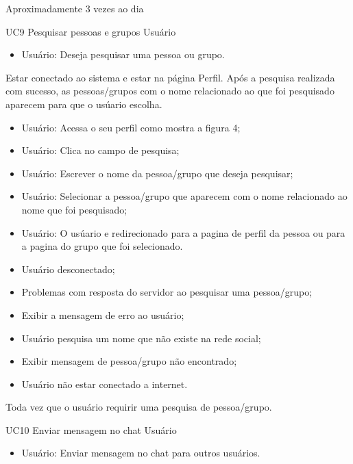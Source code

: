 {Aproximadamente 3 vezes ao dia}
{

}
\casoDeUso
{UC9}
{Pesquisar pessoas e grupos}
{Usuário}
{
\begin{itemize}
	\item Usuário: Deseja pesquisar uma pessoa ou grupo.	
\end{itemize}
}
{Estar conectado ao sistema e estar na página Perfil.}
{Após a pesquisa realizada com sucesso, as pessoas/grupos com o nome relacionado ao que foi pesquisado aparecem para que o usúario escolha.}
{
\begin{itemize}
	\item Usuário: Acessa o seu perfil como mostra a figura 4;
	\item Usuário: Clica no campo de pesquisa;
	\item Usuário: Escrever o nome da pessoa/grupo que deseja pesquisar;
	\item Usuário: Selecionar a pessoa/grupo que aparecem com o nome relacionado ao nome que foi pesquisado;
	\item Usuário: O usúario e redirecionado para a pagina de perfil da pessoa ou para a pagina do grupo que foi selecionado.
\end{itemize}
}
{
\begin{itemize}
	\item Usuário desconectado;
	\item Problemas com resposta do servidor ao pesquisar uma pessoa/grupo;
	\item Exibir a mensagem de erro ao usuário;
	\item Usuário pesquisa um nome que não existe na rede social;
	\item Exibir mensagem de pessoa/grupo não encontrado;
	\item Usuário não estar conectado a internet.
\end{itemize}
}
{Toda vez que o usuário requirir uma pesquisa de pessoa/grupo.}
{

}
\casoDeUso
{UC10}
{Enviar mensagem no chat}
{Usuário}
{
\begin{itemize}
	\item Usuário: Enviar mensagem no chat para outros usuários.
	
\end{itemize}

}

